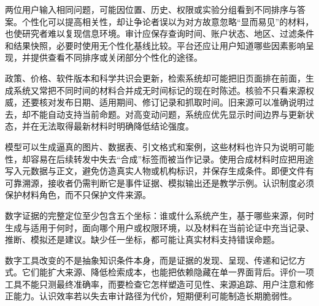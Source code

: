 两位用户输入相同问题，可能因位置、历史、权限或实验分组看到不同排序与答案。个性化可以提高相关性，却让争论者误以为对方故意忽略“显而易见”的材料，也使研究者难以复现信息环境。审计应保存查询时间、账户状态、地区、过滤条件和结果快照，必要时使用无个性化基线比较。平台还应让用户知道哪些因素影响呈现，并提供查看不同排序或关闭部分个性化的途径。

政策、价格、软件版本和科学共识会更新，检索系统却可能把旧页面排在前面，生成系统又常把不同时间的材料合并成无时间标记的现在时陈述。核验不只看来源权威，还要核对发布日期、适用期间、修订记录和抓取时间。旧来源可以准确说明过去，却不能自动支持当前命题。对高变动问题，系统应优先显示时间边界与更新状态，并在无法取得最新材料时明确降低结论强度。

模型可以生成逼真的图片、数据表、引文格式和案例，这些材料也许只为说明可能性，却容易在后续转发中失去“合成”标签而被当作记录。使用合成材料时应把用途写入元数据与正文，避免仿造真实人物或机构标识，并保存生成条件。即便文件有可靠溯源，接收者仍需判断它是事件证据、模拟输出还是教学示例。认识制度必须保护材料角色，而不只保护文件来源。

\begin{argumentbox}
数字证据的完整定位至少包含五个坐标：谁或什么系统产生，基于哪些来源，何时生成与适用于何时，面向哪个用户或权限环境，以及材料在当前论证中充当记录、推断、模拟还是建议。缺少任一坐标，都可能让真实材料支持错误命题。
\end{argumentbox}

数字工具改变的不是抽象知识条件本身，而是证据的发现、呈现、传递和记忆方式。它们能扩大来源、降低检索成本，也能把依赖隐藏在单一界面背后。评价一项工具不能只测最终准确率，而要检查它怎样塑造可见性、来源追踪、用户注意和修正能力。认识效率若以失去审计路径为代价，短期便利可能制造长期脆弱性。
